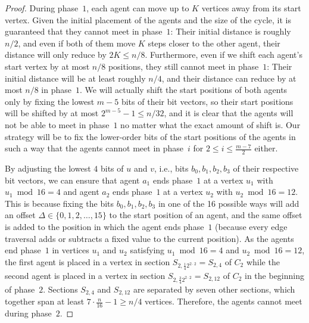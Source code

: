 \documentclass[10pt,a4paper]{article}
\begin{document}
{\begin{proof}
    During phase~$1$, each agent can move up to $K$ vertices away from its start
    vertex. Given the initial placement of the agents and the size of the cycle,
    it is guaranteed that they cannot meet in phase~$1$: {Their initial
    distance is roughly $n/2$, and even if both of them move $K$ steps closer to
    the other agent, their distance will only reduce by $2K\le n/8$.
    Furthermore, even if we shift each agent's start vertex by at most $n/8$
    positions, they still cannot meet in phase~$1$: Their initial distance will
    be at least roughly $n/4$, and their distance can reduce by at most $n/8$ in
    phase~$1$.  We will actually shift the start positions of both agents only by
    fixing the lowest $m-5$ bits of their bit vectors, so their start positions
    will be shifted by at most $2^{m-5}-1\le n/32$, and it is clear that the
    agents will not be able to meet in phase~$1$ no matter what the exact amount
    of shift is. Our strategy will be to fix the lower-order bits of the start
    positions of the agents in such a way that the agents cannot meet in
    phase~$i$ for $2\le i\le \frac{m-7}{2}$ either.}

    By adjusting the lowest $4$ bits of $u$ and $v$, i.e., bits $b_0, b_1, b_2,
    b_3$ of their respective bit vectors, we can ensure that agent $a_1$ ends
    phase~$1$ at a vertex $u_1$ with $u_{1} \bmod {16} = 4$ and agent $a_2$ ends
    phase~$1$ at a vertex $u_2$ with $u_{2} \bmod {16} = 12$. This is because
    fixing the bits $b_0, b_1, b_2, b_3$ in one of the 16 possible ways will add
    an offset $\Delta\in\{0,1,2,\ldots,15\}$ to the start position of an agent,
    and the same offset is added to the position in which the agent ends
    phase~$1$ (because every edge traversal adds or subtracts a fixed value to
    the current position). As the agents end phase~$1$ in vertices $u_1$ and
    $u_2$ satisfying $u_{1} \bmod {16} = 4$ and $u_{2} \bmod {16} = 12$, the
    first agent is placed in a vertex in section $S_{2, \frac{1}{4} 2^{2 \cdot
    2}} = S_{2, 4}$ of $C_2$ while the second agent is placed in a vertex in
    section $S_{2,  \frac{3}{4} 2^{2 \cdot 2}} = S_{2, 12}$ of $C_2$ in the
    beginning of phase~$2$. Sections $S_{2,4}$ and $S_{2, 12}$ are separated by
    seven other sections, which together span at least $7\cdot \frac{n}{16} -
    1\ge n/4$ vertices. Therefore, the agents cannot meet during phase~$2$.


\end{proof}}
\end{document}
